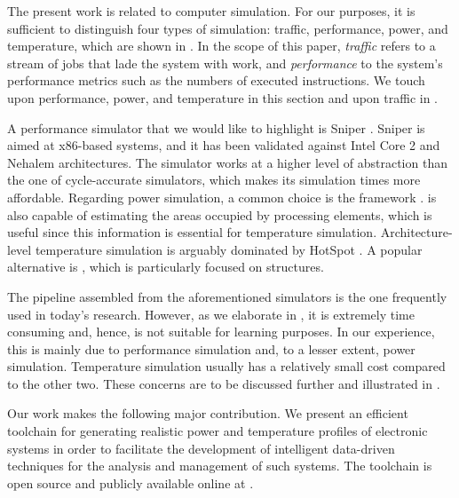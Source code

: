 The present work is related to computer simulation. For our purposes, it is
sufficient to distinguish four types of simulation: traffic, performance, power,
and temperature, which are shown in . In the scope of this
paper, \emph{traffic} refers to a stream of jobs that lade the system with work,
and \emph{performance} to the system's performance metrics such as the numbers
of executed instructions. We touch upon performance, power, and temperature in
this section and upon traffic in .

A performance simulator that we would like to highlight is Sniper
\cite{carlson2011}. Sniper is aimed at x86-based systems, and it has been
validated against Intel Core 2 and Nehalem architectures. The simulator works at
a higher level of abstraction than the one of cycle-accurate simulators, which
makes its simulation times more affordable. Regarding power simulation, a common
choice is the  framework \cite{li2009}.  is also capable of
estimating the areas occupied by processing elements, which is useful since this
information is essential for temperature simulation. Architecture-level
temperature simulation is arguably dominated by HotSpot \cite{skadron2004}. A
popular alternative is  \cite{sridhar2010}, which is particularly
focused on  structures.

The pipeline assembled from the aforementioned simulators is the one frequently
used in today's research. However, as we elaborate in , it is
extremely time consuming and, hence, is not suitable for learning purposes. In
our experience, this is mainly due to performance simulation and, to a lesser
extent, power simulation. Temperature simulation usually has a relatively small
cost compared to the other two. These concerns are to be discussed further and
illustrated in .

Our work makes the following major contribution. We present an efficient
toolchain for generating realistic power and temperature profiles of electronic
systems in order to facilitate the development of intelligent data-driven
techniques for the analysis and management of such systems. The toolchain is
open source and publicly available online at \cite{sources}.
